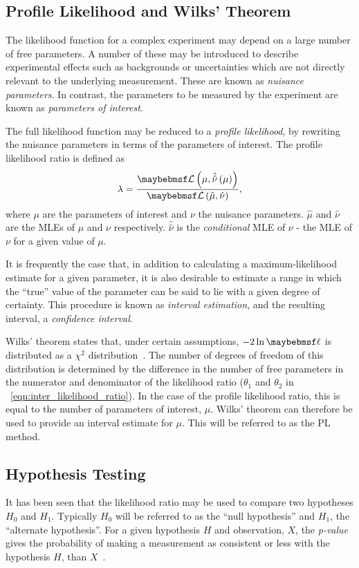\subsection{Profile Likelihood and Wilks' Theorem}
\label{sec:inter_profile_likelihood}
The likelihood function for a complex experiment may depend on a large number of
free parameters. A number of these may be introduced to describe experimental
effects such as backgrounds or uncertainties which are not directly relevant to
the underlying measurement. These are known as \emph{nuisance parameters}. In
contrast, the parameters to be measured by the experiment are known as
\emph{parameters of interest}.

The full likelihood function may be reduced to a \emph{profile likelihood}, by
rewriting the nuisance parameters in terms of the parameters of interest. The
profile likelihood ratio is defined as
\begin{equation*}
  \lambda = \frac{\likelihood\left(\mu, \hat{\hat{\nu}}\left(\mu\right)\right)}{\likelihood\left(\hat{\mu}, \hat{\nu}\right)},
\end{equation*}
where $\mu$ are the parameters of interest and $\nu$ the nuisance
parameters. $\hat{\mu}$ and $\hat{\nu}$ are the \acp{MLE} of $\mu$ and $\nu$
respectively. $\hat{\hat{\nu}}$ is the \emph{conditional} \ac{MLE} of $\nu$ -
the \ac{MLE} of $\nu$ for a given value of $\mu$.

It is frequently the case that, in addition to calculating a maximum-likelihood
estimate for a given parameter, it is also desirable to estimate a range in
which the ``true'' value of the parameter can be said to lie with a given degree
of certainty. This procedure is known as \emph{interval estimation}, and the
resulting interval, a \emph{confidence interval}.

Wilks' theorem states that, under certain assumptions, $-2\ln\likelihoodratio$
is distributed as a $\chi^2$
distribution~\cite{statistical_methods,param_estimation}. The number of degrees
of freedom of this distribution is determined by the difference in the number of
free parameters in the numerator and denominator of the likelihood ratio
($\theta_1$ and $\theta_2$ in \eqn~\ref{eqn:inter_likelihood_ratio}). In the
case of the profile likelihood ratio, this is equal to the number of parameters
of interest, $\mu$. Wilks' theorem can therefore be used to provide an interval
estimate for $\mu$. This will be referred to as the \ac{PL} method.

\subsection{Hypothesis Testing}
\label{sec:inter_cls}
It has been seen that the likelihood ratio may be used to compare two hypotheses
$H_0$ and $H_1$. Typically $H_0$ will be referred to as the ``null hypothesis''
and $H_1$, the ``alternate hypothesis''. For a given hypothesis $H$ and
observation, $X$, the \emph{p-value} gives the probability of making a
measurement as consistent or less with the hypothesis $H$, than
$X$~\cite{statistical_methods}.

